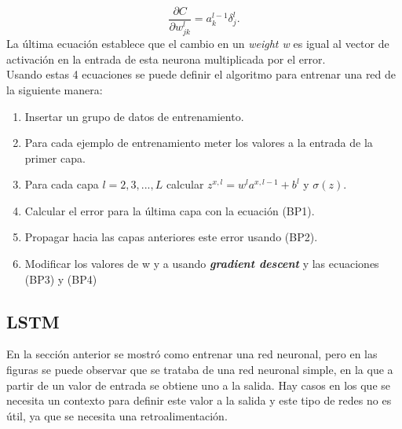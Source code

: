 \documentclass[12pt,spanish]{article}
\begin{document}
	\[ \frac{\partial C}{\partial w^l_{jk}} = a^{l-1}_k \delta^l_j.	\tag{BP4} \]
	La última ecuación establece que el cambio en un \textit{weight w} es igual al vector de activación en la entrada de esta neurona multiplicada por el error.\\
	Usando estas 4 ecuaciones se puede definir el algoritmo para entrenar una red de la siguiente manera:
	\begin{enumerate}
		\item Insertar un grupo de datos de entrenamiento.
		\item Para cada ejemplo de entrenamiento meter los valores a la entrada de la primer capa.
		\item Para cada capa $l=2,3,...,L$ calcular $z^{x,l} = w^l a^{x,l-1}+b^l$ y $\sigma(z)$.
		\item Calcular el error para la última capa con la ecuación (BP1).
		\item Propagar hacia las capas anteriores este error usando (BP2).
		\item Modificar los valores de w y a usando \textbf{\textit{gradient descent}} y las ecuaciones (BP3) y (BP4)
	\end{enumerate}
	\subsection{LSTM}
	En la sección anterior se mostró como entrenar una red neuronal, pero en las figuras se puede observar que se trataba de una red neuronal simple, en la que a partir de un valor de entrada se obtiene uno a la salida. Hay casos en los que se necesita un contexto para definir este valor a la salida y este tipo de redes no es útil, ya que se necesita una retroalimentación.
	
\end{document}

